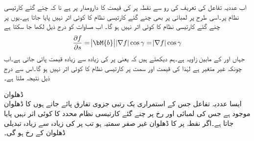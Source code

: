 اب عددیہ تفاعل کی تعریف کی رو سے  نقطہ  پر  کی قیمت کا دارومدار  پر ہے نا کہ چنے گئے کارتیسی نظام پر۔اسی طرح  پر لمبائی  پر بھی چنے گئے کارتیسی نظام کا کوئی اثر نہیں پایا جاتا ہے۔یوں  پر چنے گئے کارتیسی نظام کا کوئی اثر نہیں ہو گا۔ اب مساوات  کو درج ذیل لکھا جا سکتا ہے
\begin{align*}
\frac{\partial f}{\partial s}=\abs{\bM{b}}\abs{\nabla f}\cos \gamma=\abs{\nabla f}\cos \gamma
\end{align*}
جہاں  اور  کے مابین زاویہ  ہے۔ہم دیکھتے ہیں کہ   یعنی  پر  کی زیادہ سے زیادہ قیمت  پائی جاتی ہے۔اب چونکہ  غیر متغیر ہے لہٰذا   کی قیمت اور سمت پر کارتیسی نظام کا کوئی اثر نہیں ہو گا۔اس سے درج ذیل نتیجہ ملتا ہے۔

\quad ڈھلوان\\
ایسا عددیہ تفاعل   جس کے استمراری یک رتبی جزوی تفارق پائے جاتے ہوں کا ڈھلوان موجود ہے جس کی لمبائی اور رخ پر چنے گئے کارتیسی نظام محدد کا کوئی اثر نہیں پایا جاتا ہے۔اگر نقطہ  پر  کا ڈھلوان غیر صفر سمتیہ ہو تب  پر  کی زیادہ سے زیادہ تبدیلی ڈھلوان کے رخ ہو گی۔ 


